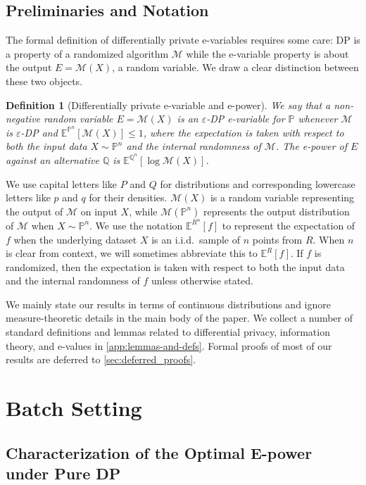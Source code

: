 \documentclass{article}
\newcommand{\Null}{\mathbb{P}}
\newcommand{\E}{\mathbb{E}}
\newcommand{\Alt}{\mathbb{Q}}
\newcommand{\M}{\mathcal{M}}
\newcommand{\eps}{\varepsilon}
\newtheorem{definition}{Definition}[section]
\begin{document}
\subsection*{Preliminaries and Notation}

The formal definition of differentially private e-variables requires some care: DP is a property of a randomized algorithm $\M$ while the e-variable property is about the output $E=\M(X)$, a random variable.
We draw a clear distinction between these two objects.
\begin{definition}[Differentially private e-variable and e-power]
    We say that a non-negative random variable $E = \M(X)$ is an \emph{$\eps$-DP e-variable for $\Null$} whenever $\M$ is $\varepsilon$-DP and $\E^{\Null^n}[\M(X)] \leq 1$, where the expectation is taken with respect to both the input data $X \sim \Null^n$ and the internal randomness of $\M$. The e-power of $E$ against an alternative $\Alt$ is $\E^{\Alt^n}[\log \M(X)]$.
\end{definition}

 We use capital letters like $P$ and $Q$ for distributions and corresponding lowercase letters like $p$ and $q$ for their densities. $\M(X)$ is a random variable representing the output of $\M$ on input $X$, while $\M(\Null^n)$ represents the output distribution of $\M$ when $X \sim \Null^n$. We use the notation $\E^{R^n}[f]$ to represent the expectation of $f$ when the underlying dataset $X$ is an i.i.d.\ sample of $n$ points from $R$. When $n$ is clear from context, we will sometimes abbreviate this to $\E^R[f]$. If $f$ is randomized, then the expectation is taken with respect to both the input data and the internal randomness of $f$ unless otherwise stated. 
 
We mainly state our results in terms of continuous distributions and ignore measure-theoretic details in the main body of the paper. We collect a number of standard definitions and lemmas related to differential privacy, information theory, and e-values in \cref{app:lemmas-and-defs}. Formal proofs of most of our results are deferred to \cref{sec:deferred_proofs}. 


\section{Batch Setting}\label{sec:batch}
\subsection{Characterization of the Optimal E-power under Pure DP}
\label{sec:batch_optimal}
\end{document}
